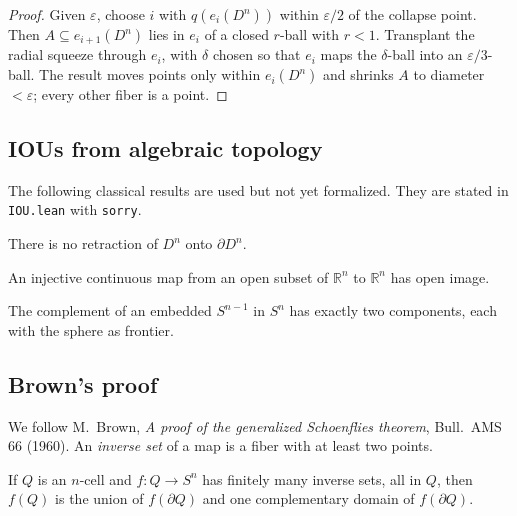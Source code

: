 \begin{proof}
  \leanok
  Given $\varepsilon$, choose $i$ with $q(e_i(D^n))$ within $\varepsilon/2$ of the
  collapse point. Then $A\subseteq e_{i+1}(D^n)$ lies in $e_i$ of a closed
  $r$-ball with $r<1$. Transplant the radial squeeze through $e_i$, with $\delta$
  chosen so that $e_i$ maps the $\delta$-ball into an $\varepsilon/3$-ball. The
  result moves points only within $e_i(D^n)$ and shrinks $A$ to diameter
  $<\varepsilon$; every other fiber is a point.
\end{proof}

\subsection*{IOUs from algebraic topology}

The following classical results are used but not yet formalized. They are stated
in \texttt{IOU.lean} with \texttt{sorry}.

\begin{theorem}
  \label{iou:noretract}
  \leanok
  There is no retraction of $D^n$ onto $\partial D^n$.
\end{theorem}

\begin{theorem}
  \label{iou:iod}
  \leanok
  An injective continuous map from an open subset of $\mathbb{R}^n$ to
  $\mathbb{R}^n$ has open image.
\end{theorem}

\begin{theorem}
  \label{iou:jb}
  \leanok
  The complement of an embedded $S^{n-1}$ in $S^n$ has exactly two components,
  each with the sphere as frontier.
\end{theorem}

\subsection*{Brown's proof}

We follow M.~Brown, \emph{A proof of the generalized Schoenflies theorem}, Bull.\ AMS
66 (1960). An \emph{inverse set} of a map is a fiber with at least two points.

\begin{theorem}
  \label{thm:brown0}
  If $Q$ is an $n$-cell and $f\colon Q\to S^n$ has finitely many inverse sets, all
  in $Q$, then $f(Q)$ is the union of $f(\partial Q)$ and one complementary domain of
  $f(\partial Q)$.
\end{theorem}

